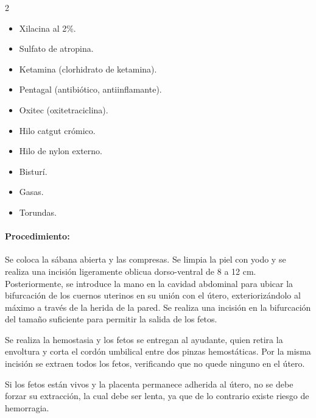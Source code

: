             \begin{center}
                \begin{minipage}{\linewidth}
                    \begin{multicols}{2}
                        \begin{itemize}
                            \item Xilacina al 2\%.
                            \item Sulfato de atropina.
                            \item Ketamina (clorhidrato de ketamina).
                            \item Pentagal (antibiótico, antiinflamante).
                            \item Oxitec (oxitetraciclina).
                            \item Hilo catgut crómico.
                            \item Hilo de nylon externo.
                            \item Bisturí.
                            \item Gasas.
                            \item Torundas.
                        \end{itemize}
                    \end{multicols}
                \end{minipage}
            \end{center}

            \paragraph{Procedimiento:} Se coloca la sábana abierta y las compresas. Se limpia la piel con yodo y se realiza una incisión ligeramente oblicua dorso-ventral de 8 a 12\! cm. Posteriormente, se introduce la mano en la cavidad abdominal para ubicar la bifurcación de los cuernos uterinos en su unión con el útero, exteriorizándolo al máximo a través de la herida de la pared. Se realiza una incisión en la bifurcación del tamaño suficiente para permitir la salida de los fetos.

            Se realiza la hemostasia y los fetos se entregan al ayudante, quien retira la envoltura y corta el cordón umbilical entre dos pinzas hemostáticas. Por la misma incisión se extraen todos los fetos, verificando que no quede ninguno en el útero.

            Si los fetos están vivos y la placenta permanece adherida al útero, no se debe forzar su extracción, la cual debe ser lenta, ya que de lo contrario existe riesgo de hemorragia.

